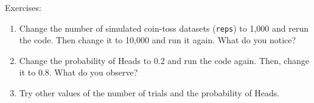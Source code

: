 Exercises:
\begin{enumerate}
\item Change the number of simulated coin-toss datasets (\texttt{reps}) to 1,000 and rerun the code. Then change it to 10,000 and run it again. What do you notice?
\item Change the probability of Heads to 0.2 and run the code again. Then, change it to 0.8. What do you observe?
\item Try other values of the number of trials and the probability of Heads.
\end{enumerate}

